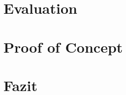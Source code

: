 \documentclass[
11pt, %
a4paper, %
BCOR10mm, %
DIV14, %
footsepline = false, %
headsepline, %
oneside, %
openright,
parskip=half, %
abstracton, %
listof=totocnumbered, %
bibliography=totocnumbered %
]{scrreprt}
\begin{document}
  \chapter{Evaluation}
  \label{cha:evaluation}
  

  \chapter{Proof of Concept}
  \label{cha:proof_of_concept}
  
  
  \chapter{Fazit}
  \label{cha:fazit}
  
  \appendix  
  \listoffigures
  \listoftables
  \lstlistoflistings
  
  \glsaddall
  \printglossaries
  
  \nocite{*}
  
  
\end{document}

